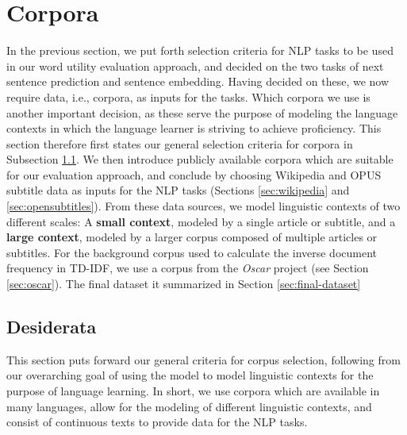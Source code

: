 \section{Corpora}
In the previous section, we put forth selection criteria for NLP tasks to be used in our word utility evaluation approach, and decided on the two tasks of next sentence prediction and sentence embedding.
Having decided on these, we now require data, i.e., corpora, as inputs for the tasks.
Which corpora we use is another important decision, as these serve the purpose of modeling the language contexts in which the language learner is striving to achieve proficiency.
This section therefore first states our general selection criteria for corpora in Subsection \ref{sec:corpora-desiderata}.
We then introduce publicly available corpora which are suitable for our evaluation approach, and conclude by choosing Wikipedia and OPUS subtitle data as inputs for the NLP tasks (Sections \ref{sec:wikipedia} and \ref{sec:opensubtitles}).
From these data sources, we model linguistic contexts of two different scales:
A \textbf{small context}, modeled by a single article or subtitle, and a \textbf{large context}, modeled by a larger corpus composed of multiple articles or subtitles.
For the background corpus used to calculate the inverse document frequency in TD-IDF, we use a corpus from the \textit{Oscar} project (see Section \ref{sec:oscar}).
The final dataset it summarized in Section \ref{sec:final-dataset}

\subsection{Desiderata} \label{sec:corpora-desiderata}
This section puts forward our general criteria for corpus selection, following from our overarching goal of using the model to model linguistic contexts for the purpose of language learning.
In short, we use corpora which are available in many languages, allow for the modeling of different linguistic contexts, and consist of continuous texts to provide data for the NLP tasks.

